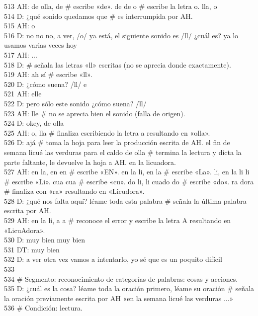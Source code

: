 513 AH: de olla, de \# escribe «de». de de o \# escribe la letra o. lla, o\\
514 D: ¿qué sonido quedamos que \# es interrumpida por AH.\\
515 AH: o\\
516 D: no no no, a ver, /o/ ya está, el siguiente sonido es /ll/ ¿cuál es? ya lo usamos varias veces hoy\\
517 AH: ...\\
518 D: \# señala las letras «ll» escritas (no se aprecia donde exactamente).\\
519 AH: ah sí \# escribe «ll».\\
520 D: ¿cómo suena? /ll/ e\\
521 AH: elle\\
522 D: pero sólo este sonido ¿cómo suena? /ll/\\
523 AH: lle \# no se aprecia bien el sonido (falla de origen).\\
524 D: okey, de olla\\
525 AH: o, lla \# finaliza escribiendo la letra a resultando en «olla».\\
526 D: ajá \# toma la hoja para leer la producción escrita de AH. el fin de semana licué las verduras para el caldo de olla \# termina la lectura y dicta la parte faltante, le devuelve la hoja a AH. en la licuadora.\\
527 AH: en la, en en \# escribe «EN». en la li, en la \# escribe «La». li, en la li li \# escribe «Li». cua cua \# escribe «cu». do li, li cuado do \# escribe «do». ra dora \# finaliza con «ra» resultando en «Licudora».\\
528 D: ¿qué nos falta aquí? léame toda esta palabra \# señala la última palabra escrita por AH.\\
529 AH: en la li, a a \# reconoce el error y escribe la letra A resultando en «LicuAdora».\\
530 D: muy bien muy bien\\
531 DT: muy bien\\
532 D: a ver otra vez vamos a intentarlo, yo sé que es un poquito difícil\\
533 \\
534 \# Segmento: reconocimiento de categorías de palabras: cosas y acciones.\\
535 D: ¿cuál es la cosa? léame toda la oración primero, léame su oración \# señala la oración previamente escrita por AH «en la semana licué las verduras ...» \\
536 \# Condición: lectura.\\
